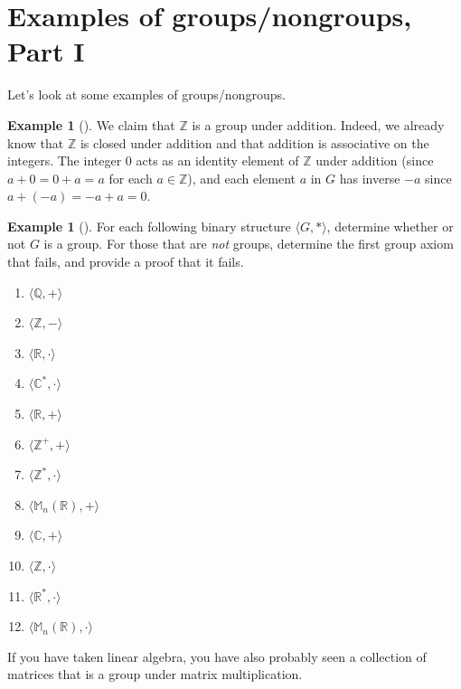 \documentclass[10pt,openany,oneside]{book}
\theoremstyle{plain}
\theoremstyle{definition}
\theoremstyle{definition}
\theoremstyle{definition}
\newtheorem{example}[theorem]{Example}
\theoremstyle{definition}
\numberwithin{equation}{section}
\def\Z{\mathbb{Z}}
\def\R{\mathbb{R}}
\def\Q{\mathbb{Q}}
\def\C{\mathbb{C}}
\def\M{\mathbb{M}}
\begin{document}
\section[{Examples of groups/nongroups, Part I}]{Examples of groups/nongroups, Part I}\label{section-6}
Let's look at some examples of groups/nongroups.%
\begin{example}[]\label{example-10}
We claim that \(\Z\) is a group under addition. Indeed, we already know that \(\Z\) is closed under addition and that addition is associative on the integers. The integer \(0\) acts as an identity element of \(\Z\) under addition (since \(a+0=0+a=a\) for each \(a\in
\Z\)), and each element \(a\) in \(G\) has inverse \(-a\) since \(a+(-a)=-a+a=0\).%
\end{example}
\begin{example}[]\label{example-11}
For each following binary structure \(\langle G,*\rangle\), determine whether or not \(G\) is a group. For those that are \emph{not} groups, determine the first group axiom  that fails, and provide a proof that it fails. \leavevmode%
\begin{multicols}{4}
\begin{enumerate}
\item\hypertarget{li-79}{}\(\langle \Q,+\rangle\)%
\item\hypertarget{li-80}{}\(\langle \Z,-\rangle\)%
\item\hypertarget{li-81}{}\(\langle \R,\cdot\rangle\)%
\item\hypertarget{li-82}{}\(\langle \C^*,\cdot\rangle\)%
\item\hypertarget{li-83}{}\(\langle \R,+\rangle\)%
\item\hypertarget{li-84}{}\(\langle \Z^+,+\rangle\)%
\item\hypertarget{li-85}{}\(\langle \Z^*,\cdot\rangle\)%
\item\hypertarget{li-86}{}\(\langle \M_n(\R),+\rangle\)%
\item\hypertarget{li-87}{}\(\langle \C,+\rangle\)%
\item\hypertarget{li-88}{}\(\langle \Z,\cdot\rangle\)%
\item\hypertarget{li-89}{}\(\langle \R^*,\cdot\rangle\)%
\item\hypertarget{li-90}{}\(\langle \M_n(\R),\cdot\rangle\)%
\end{enumerate}
\end{multicols}
%
\end{example}
If you have taken linear algebra, you have also probably seen a collection of matrices that is a group under matrix multiplication.%
\end{document}
